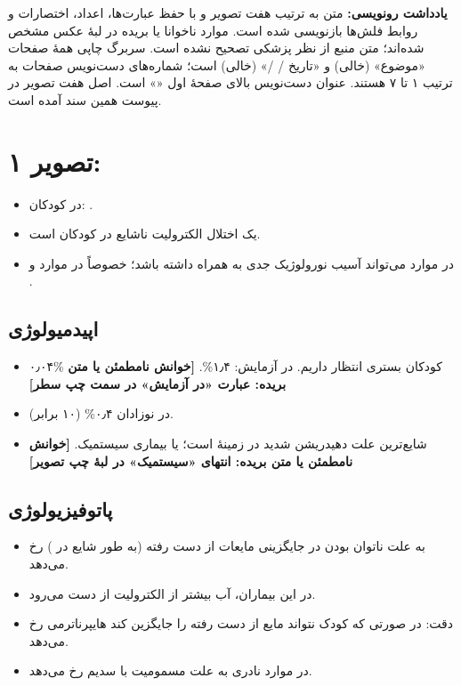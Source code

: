 \documentclass[12pt,a4paper]{article}
\begin{document}
\fi
\providecommand{\HNmath}[1]{\lr{\(#1\)}}
\providecommand{\HNunclear}[1]{\textbf{[خوانش نامطمئن یا متن بریده: #1]}}
\providecommand{\HNpage}[2]{\clearpage\section*{تصویر #1: \lr{#2}}}

\begin{center}
{\Large\bfseries {}}
\end{center}
\textbf{یادداشت رونویسی:} متن به ترتیب هفت تصویر و با حفظ عبارت‌ها، اعداد، اختصارات و روابط فلش‌ها بازنویسی شده است. موارد ناخوانا یا بریده در لبهٔ عکس مشخص شده‌اند؛ متن منبع از نظر پزشکی تصحیح نشده است. سربرگ چاپی همهٔ صفحات «موضوع» (خالی) و «تاریخ / /» (خالی) است؛ شماره‌های دست‌نویس صفحات به ترتیب ۱ تا ۷ هستند. عنوان دست‌نویس بالای صفحهٔ اول «» است. اصل هفت تصویر در پیوست همین سند آمده است.

\HNpage{۱}{pic01.jpg}
\begin{itemize}
\item در کودکان: \HNmath{150<\mathrm{Na}}.
\item یک اختلال الکترولیت ناشایع در کودکان است.
\item در موارد  می‌تواند آسیب نورولوژیک جدی به همراه داشته باشد؛ خصوصاً در موارد  و .
\end{itemize}
\subsection*{اپیدمیولوژی}
\begin{itemize}
\item ۰٫۰۴\% کودکان بستری انتظار داریم. در آزمایش: ۱٫۴\%. \HNunclear{عبارت «در آزمایش» در سمت چپ سطر}
\item در نوزادان ۰٫۴\% (۱۰ برابر).
\item شایع‌ترین علت دهیدریشن شدید در زمینهٔ  است؛ یا بیماری سیستمیک. \HNunclear{انتهای «سیستمیک» در لبهٔ چپ تصویر}
\end{itemize}
\subsection*{پاتوفیزیولوژی}
\begin{itemize}
\item به علت ناتوان بودن در جایگزینی مایعات از دست رفته (به طور شایع در ) رخ می‌دهد.
\item در این بیماران، آب بیشتر از الکترولیت از دست می‌رود.
\item دقت: در صورتی که کودک نتواند مایع از دست رفته را جایگزین کند هایپرناترمی رخ می‌دهد.
\item در موارد نادری به علت مسمومیت با سدیم رخ می‌دهد.
\end{itemize}
\end{document}
